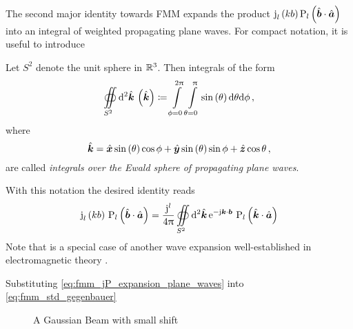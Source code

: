 The second major identity towards \ac{FMM} expands the product 
$\sphbesselj{l} \left( k b \right) \legendrepl{l} \left( \uv{b} \cdot \uv{a} \right)$
into an integral of weighted propagating plane waves. For compact notation, it
is useful to introduce
\begin{definition}\label{def:ewald_sphere}
	Let $S^2$ denote the unit sphere in $\mathbb{R}^3$. Then
	integrals of the form
	\begin{equation}\label{eq:ewald_sphere_integral}
		\ewaldintegral \left(\uv{k}\right) 
		\coloneqq
		\int\limits_{\phi = 0}^{2\pi} \int\limits_{\theta = 0}^{\pi}
		\sin\left(\theta \right) \dd \theta \dd \phi \, ,
	\end{equation}
	where
	\begin{equation}
		\uv{k} =
		\uv{x} \sin \left(\theta\right) \cos \phi +
		\uv{y} \sin \left(\theta\right) \sin \phi +
		\uv{z} \cos \theta \, ,
	\end{equation}
	are called \emph{integrals over the Ewald sphere of propagating plane waves}.
\end{definition}
With this notation the desired identity reads
\begin{equation}\label{eq:fmm_jP_expansion_plane_waves}
		\sphbesselj{l} \left( k b    \right) \,
		\legendrepl{l} \left( \uv{b} \cdot \uv{a} \right) = 
		\frac{\im^l}{4\pi}	
		\ewaldintegral
		\exp{-\im \pvec{k} \cdot \pvec{b}}
		\legendrepl{l} \left( \uv{k} \cdot \uv{a} \right)
\end{equation}
Note that is a special case of another wave expansion well-established in
electromagnetic theory \cite[p.~410]{Stratton2007}.

Substituting \eqref{eq:fmm_jP_expansion_plane_waves} into
\eqref{eq:fmm_std_gegenbauer}









\begin{figure}
    \centering
    \caption{A Gaussian Beam with small shift}
\end{figure}


